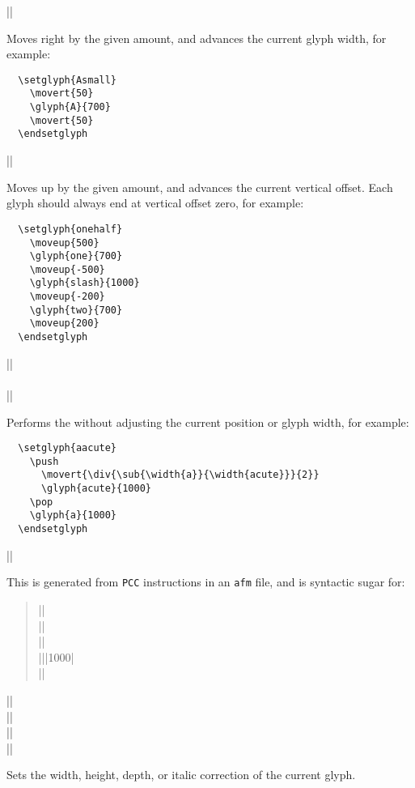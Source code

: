 \documentclass[a4paper]{ltxguide}
\newcommand*{\setfilename}[1]{\texttt{#1}}
\newcommand{\afm}{\setfilename{afm}\xspace}
\begin{document}
\begin{decl}
  |\movert|
\end{decl}
Moves right by the given amount, and advances the current glyph width,
for example:
\begin{verbatim}
  \setglyph{Asmall}
    \movert{50}
    \glyph{A}{700}
    \movert{50}
  \endsetglyph
\end{verbatim}

\begin{decl}
  |\moveup|
\end{decl}
Moves up by the given amount, and advances the current vertical
offset.  Each glyph should always end at vertical offset zero, for
example:
\begin{verbatim}
  \setglyph{onehalf}
    \moveup{500}
    \glyph{one}{700}
    \moveup{-500}
    \glyph{slash}{1000}
    \moveup{-200}
    \glyph{two}{700}
    \moveup{200}
  \endsetglyph
\end{verbatim}

\begin{decl}
  |\push|\\
  \\
  |\pop|
\end{decl}
Performs the  without adjusting the current position
or glyph width, for example:
\begin{verbatim}
  \setglyph{aacute}
    \push
      \movert{\div{\sub{\width{a}}{\width{acute}}}{2}}
      \glyph{acute}{1000}
    \pop
    \glyph{a}{1000}
  \endsetglyph
\end{verbatim}

\begin{decl}
  |\glyphpcc|
\end{decl}
This is generated from \texttt{PCC} instructions in an \afm file, and
is syntactic sugar for:
\begin{quote}
\begin{small}
|\push|\\
|\movert|\\
|\moveup|\\
|\glyph||{1000}|\\
|\pop|
\end{small}
\end{quote}

\begin{decl}
  |\resetwidth|\\
  |\resetheight|\\
  |\resetdepth|\\
  |\resetitalic|
\end{decl}
Sets the width, height, depth, or italic correction of the current
glyph.
\end{document}
